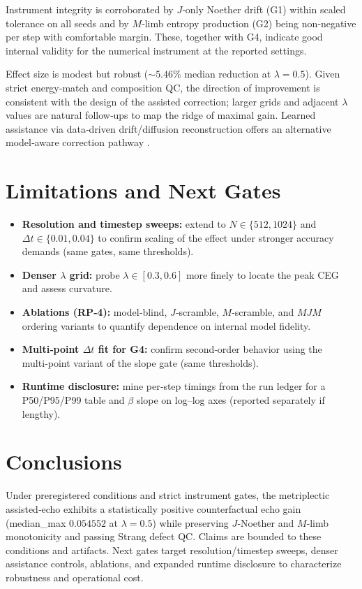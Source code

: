 \documentclass{article}
\begin{document}
Instrument integrity is corroborated by $J$‑only Noether drift (G1) within scaled tolerance on all seeds and by $M$‑limb entropy production (G2) being non‑negative per step with comfortable margin. These, together with G4, indicate good internal validity for the numerical instrument at the reported settings.

Effect size is modest but robust ($\sim 5.46\%$ median reduction at $\lambda=0.5$). Given strict energy‑match and composition QC, the direction of improvement is consistent with the design of the assisted correction; larger grids and adjacent $\lambda$ values are natural follow‑ups to map the ridge of maximal gain. Learned assistance via data‑driven drift/diffusion reconstruction offers an alternative model‑aware correction pathway \citep{DataDrivenLangevinReconstruction}.

\section{Limitations and Next Gates}
\begin{itemize}[leftmargin=*]
  \item \textbf{Resolution and timestep sweeps:} extend to $N\in\{512,1024\}$ and $\Delta t\in\{0.01,0.04\}$ to confirm scaling of the effect under stronger accuracy demands (same gates, same thresholds).
  \item \textbf{Denser $\lambda$ grid:} probe $\lambda\in[0.3,0.6]$ more finely to locate the peak CEG and assess curvature.
  \item \textbf{Ablations (RP‑4):} model‑blind, $J$‑scramble, $M$‑scramble, and $M\!J\!M$ ordering variants to quantify dependence on internal model fidelity.
  \item \textbf{Multi‑point $\Delta t$ fit for G4:} confirm second‑order behavior using the multi‑point variant of the slope gate (same thresholds).
  \item \textbf{Runtime disclosure:} mine per‑step timings from the run ledger for a P50/P95/P99 table and $\beta$ slope on log–log axes (reported separately if lengthy).
\end{itemize}

\section{Conclusions}
Under preregistered conditions and strict instrument gates, the metriplectic assisted‑echo exhibits a statistically positive counterfactual echo gain (median\_max $0.054552$ at $\lambda=0.5$) while preserving $J$‑Noether and $M$‑limb monotonicity and passing Strang defect QC. Claims are bounded to these conditions and artifacts. Next gates target resolution/timestep sweeps, denser assistance controls, ablations, and expanded runtime disclosure to characterize robustness and operational cost.
\end{document}
